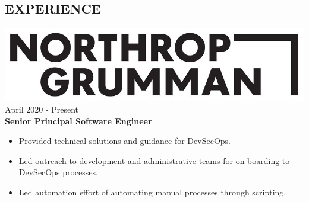 \documentclass[12pt, line, margin]{res}
\begin{document}
\begin{resume}
\section{ EXPERIENCE} {\sl  \includegraphics[scale=0.115, trim=10 10 25 25]{resume_images/Northrop_Grumman-2020-black-logo.jpeg}} \hfill April 2020 - Present \\
                \textbf{Senior Principal Software Engineer} 
                 \begin{itemize}  \itemsep -2pt %
	         \item   Provided technical solutions and guidance for DevSecOps.
	         \item   Led outreach to development and administrative teams for \newline
                                on-boarding to DevSecOps processes.
                  \item   Led automation effort of automating manual processes through 
                                scripting.
                \end{itemize}



\end{resume}
\end{document}
